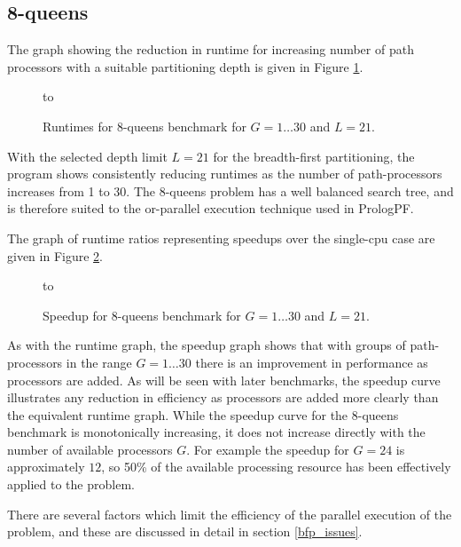 \subsection{8-queens}

The graph showing the reduction in runtime for increasing number of 
path processors with a suitable partitioning depth is given in Figure \ref{queens8_cut_c_L_21}.

\begin{figure}[htbp]
\vspace{5mm} \hbox to 
\caption{Runtimes for 8-queens benchmark for $G=1\ldots 30$ and $L=21$.}
\vspace{5mm}
\label{queens8_cut_c_L_21}
\end{figure}

With the selected depth limit $L=21$ for the breadth-first
partitioning, the program shows consistently reducing runtimes as the
number of path-processors increases from 1 to 30.  The 8-queens
problem has a well balanced search tree, and is therefore suited to
the or-parallel execution technique used in PrologPF.

The graph of runtime ratios representing
speedups over the single-cpu case are given in Figure \ref{q8_cut_c_L_21_spdup}.

\begin{figure}[htbp]
\vspace{5mm} \hbox to 
\caption{Speedup for 8-queens benchmark for $G=1\ldots 30$ and $L=21$.}
\vspace{5mm}
\label{q8_cut_c_L_21_spdup}
\end{figure}

As with the runtime graph, the speedup graph shows that with groups of
path-processors in the range $G=1\ldots 30$ there is an improvement in
performance as processors are added.  As will be seen with later
benchmarks, the speedup curve illustrates any reduction in efficiency
as processors are added more clearly than the equivalent runtime
graph.  While the speedup curve for the 8-queens benchmark is
monotonically increasing, it does not increase directly with the
number of available processors $G$.  For example the speedup for
$G=24$ is approximately $12$, so 50\% of the available processing
resource has been effectively applied to the problem.

There are several factors which limit the efficiency of the parallel
execution of the problem, and these are discussed in detail in section
\ref{bfp_issues}.

